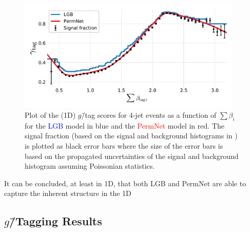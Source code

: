 \begin{figure}
  \centerfloat
  \includegraphics[width=0.95\textwidth, trim=10 10 10 20, clip]{figures/quarks/gtag_sum_models_njet=4-down_sample=1.00-ML_vars=vertex-selection=b-ejet_min=4-n_iter_RS_lgb=99-n_iter_RS_xgb=9-cdot_cut=0.90-version=19.pdf}
  \caption[1D Sum Models Predictions and Signal Fraction for 4-jets events]
          {Plot of the (1D) $g$\=/tag scores for 4-jet events as a function of $\sum \beta_i$ for the \textcolor{blue}{LGB} model in blue and the \textcolor{red}{PermNet} model in red. The signal fraction (based on the signal and background histograms in ) is plotted as black error bars where the size of the error bars is based on the propagated uncertainties of the signal and background histogram assuming Poissonian statistics. } 
  \label{fig:q:1d_sum_models_signal_fraction_4j}
\end{figure}

It can be concluded, at least in 1D, that both LGB and PermNet are able to capture the inherent structure in the 1D


\subsection{$g$\=/Tagging Results}

